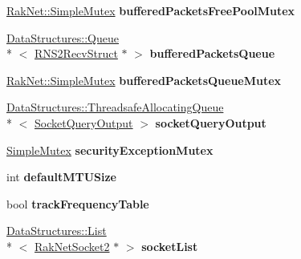 \begin{DoxyCompactItemize}
\item 
\hypertarget{class_rak_net_1_1_rak_peer_a60e248900048eca80a9ff9c408b3070c}{\hyperlink{class_rak_net_1_1_simple_mutex}{Rak\-Net\-::\-Simple\-Mutex} {\bfseries buffered\-Packets\-Free\-Pool\-Mutex}}\label{class_rak_net_1_1_rak_peer_a60e248900048eca80a9ff9c408b3070c}

\item 
\hypertarget{class_rak_net_1_1_rak_peer_aef9fcad539891fd3e05bd98a7cc8281d}{\hyperlink{class_data_structures_1_1_queue}{Data\-Structures\-::\-Queue}\\*
$<$ \hyperlink{struct_rak_net_1_1_r_n_s2_recv_struct}{R\-N\-S2\-Recv\-Struct} $\ast$ $>$ {\bfseries buffered\-Packets\-Queue}}\label{class_rak_net_1_1_rak_peer_aef9fcad539891fd3e05bd98a7cc8281d}

\item 
\hypertarget{class_rak_net_1_1_rak_peer_a0ed1109b04009110d640485699f4e485}{\hyperlink{class_rak_net_1_1_simple_mutex}{Rak\-Net\-::\-Simple\-Mutex} {\bfseries buffered\-Packets\-Queue\-Mutex}}\label{class_rak_net_1_1_rak_peer_a0ed1109b04009110d640485699f4e485}

\item 
\hypertarget{class_rak_net_1_1_rak_peer_a4b7cf53321811e7f33caab81f242fd6f}{\hyperlink{class_data_structures_1_1_threadsafe_allocating_queue}{Data\-Structures\-::\-Threadsafe\-Allocating\-Queue}\\*
$<$ \hyperlink{struct_rak_net_1_1_rak_peer_1_1_socket_query_output}{Socket\-Query\-Output} $>$ {\bfseries socket\-Query\-Output}}\label{class_rak_net_1_1_rak_peer_a4b7cf53321811e7f33caab81f242fd6f}

\item 
\hypertarget{class_rak_net_1_1_rak_peer_a7c70a4d30a28753302a3d43c2bccdf8b}{\hyperlink{class_rak_net_1_1_simple_mutex}{Simple\-Mutex} {\bfseries security\-Exception\-Mutex}}\label{class_rak_net_1_1_rak_peer_a7c70a4d30a28753302a3d43c2bccdf8b}

\item 
\hypertarget{class_rak_net_1_1_rak_peer_a7823fdc283b8d33881c79e5e58e2981b}{int {\bfseries default\-M\-T\-U\-Size}}\label{class_rak_net_1_1_rak_peer_a7823fdc283b8d33881c79e5e58e2981b}

\item 
\hypertarget{class_rak_net_1_1_rak_peer_aef445b1b72d87eea8e2ebf8c6546b93d}{bool {\bfseries track\-Frequency\-Table}}\label{class_rak_net_1_1_rak_peer_aef445b1b72d87eea8e2ebf8c6546b93d}

\item 
\hypertarget{class_rak_net_1_1_rak_peer_a3f8f751a77999f6c8edf30a9c723a560}{\hyperlink{class_data_structures_1_1_list}{Data\-Structures\-::\-List}\\*
$<$ \hyperlink{class_rak_net_1_1_rak_net_socket2}{Rak\-Net\-Socket2} $\ast$ $>$ {\bfseries socket\-List}}\label{class_rak_net_1_1_rak_peer_a3f8f751a77999f6c8edf30a9c723a560}


\end{DoxyCompactItemize}
